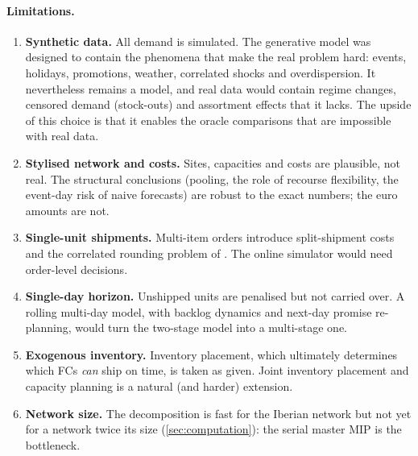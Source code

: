 \paragraph{Limitations.}
\begin{enumerate}
  \item \textbf{Synthetic data.} All demand is simulated. The generative model was designed to contain the phenomena that make the real problem hard: events, holidays, promotions, weather, correlated shocks and overdispersion. It nevertheless remains a model, and real data would contain regime changes, censored demand (stock-outs) and assortment effects that it lacks. The upside of this choice is that it enables the oracle comparisons that are impossible with real data.
  \item \textbf{Stylised network and costs.} Sites, capacities and costs are plausible, not real. The structural conclusions (pooling, the role of recourse flexibility, the event-day risk of naive forecasts) are robust to the exact numbers; the euro amounts are not.
  \item \textbf{Single-unit shipments.} Multi-item orders introduce split-shipment costs and the correlated rounding problem of \citet{jasin2015,ma2023}. The online simulator would need order-level decisions.
  \item \textbf{Single-day horizon.} Unshipped units are penalised but not carried over. A rolling multi-day model, with backlog dynamics and next-day promise re-planning, would turn the two-stage model into a multi-stage one.
  \item \textbf{Exogenous inventory.} Inventory placement, which ultimately determines which FCs \emph{can} ship on time, is taken as given. Joint inventory placement and capacity planning is a natural (and harder) extension.
  \item \textbf{Network size.} The decomposition is fast for the Iberian network but not yet for a network twice its size (\cref{sec:computation}): the serial master MIP is the bottleneck.
\end{enumerate}

